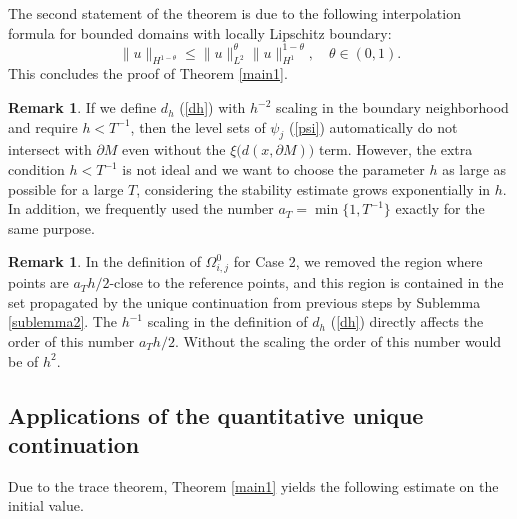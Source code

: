\documentclass[11pt,letterpaper]{amsart}
\numberwithin{equation}{section}
\theoremstyle{definition}
\theoremstyle{plain}
\theoremstyle{definition}
\theoremstyle{plain}
\theoremstyle{definition}
\newtheorem{remark}[remark0]{Remark}
\theoremstyle{plain}
\begin{document}
The second statement of the theorem is due to the following interpolation formula for bounded domains with locally Lipschitz boundary:
$$\|u\|_{H^{1-\theta}}\leqslant \|u\|_{L^2}^{\theta}\|u\|_{H^1}^{1-\theta},\quad \theta\in (0,1).$$
This concludes the proof of Theorem \ref{main1}.


\begin{remark}
If we define $d_h$ (\ref{dh}) with $h^{-2}$ scaling in the boundary neighborhood and require $h<T^{-1}$, then the level sets of $\psi_j$ (\ref{psi}) automatically do not intersect with $\partial M$ even without the $\xi\big(d(x,\partial M)\big)$ term. However, the extra condition $h<T^{-1}$ is not ideal and we want to choose the parameter $h$ as large as possible for a large $T$, considering the stability estimate grows exponentially in $h$. In addition, we frequently used the number $a_T=\min\{1,T^{-1}\}$ exactly for the same purpose.
\end{remark}

\begin{remark}
In the definition of $\Omega_{i,j}^0$ for Case 2, we removed the region where points are $a_T h/2$-close to the reference points, and this region is contained in the set propagated by the unique continuation from previous steps by Sublemma \ref{sublemma2}. The $h^{-1}$ scaling in the definition of $d_h$ (\ref{dh}) directly affects the order of this number $a_T h/2$. Without the scaling the order of this number would be of $h^2$.
\end{remark}


\subsection{Applications of the quantitative unique continuation}\hfill

\smallskip
Due to the trace theorem, Theorem \ref{main1} yields the following estimate on the initial value.
\end{document}
